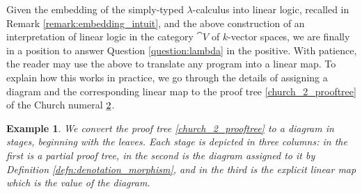 \documentclass[english,letter paper,12pt,reqno]{article}
\theoremstyle{example}
\newtheorem{example}[theorem]{Example}
\numberwithin{equation}{section}
\begin{document}
Given the embedding of the simply-typed $\lambda$-calculus into linear logic, recalled in Remark \ref{remark:embedding_intuit}, and the above construction of an interpretation of linear logic in the category $\cat{V}$ of $k$-vector spaces, we are finally in a position to answer Question \ref{question:lambda} in the positive. With patience, the reader may use the above to translate any program into a linear map. To explain how this works in practice, we go through the details of assigning a diagram and the corresponding linear map to the proof tree \eqref{church_2_prooftree} of the Church numeral $\underline{2}$. 

\begin{example}\label{example:church_2} We convert the proof tree \eqref{church_2_prooftree} to a diagram in stages, beginning with the leaves. Each stage is depicted in three columns: in the first is a partial proof tree, in the second is the diagram assigned to it by Definition \ref{defn:denotation_morphism}, and in the third is the explicit linear map which is the value of the diagram. 


\end{example}
\end{document}
